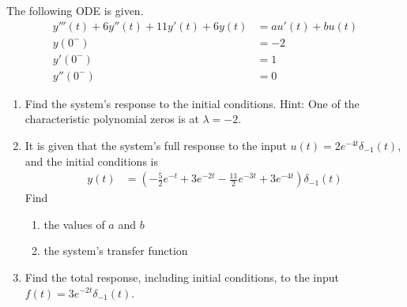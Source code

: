 \documentclass[fleqn, a4paper, 11pt, oneside]{amsart}
\theoremstyle{definition}
\theoremstyle{theorem}
\begin{document}
\begin{question}
	The following ODE is given.
	\begin{align*}
		y'''(t) + 6 y''(t) + 11 y'(t) + 6 y(t) & = a u'(t) + b u(t) \\
		y(0^-)                                 & = -2               \\
		y'(0^-)                                & = 1                \\
		y''(0^-)                               & = 0
	\end{align*}
	\begin{enumerate}
		\item
			Find the system's response to the initial conditions.
			Hint: One of the characteristic polynomial zeros is at $\lambda = -2$.
		\item
			It is given that the system's full response to the input $u(t) = 2 e^{-4 t} \delta_{-1}(t)$, and the initial conditions is
			\begin{align*}
				y(t) & = \left( -\frac{5}{2} e^{-t} + 3 e^{-2 t} - \frac{11}{2} e^{-3 t} + 3 e^{-4 t} \right) \delta_{-1}(t)
			\end{align*}
			Find
			\begin{enumerate}
				\item the values of $a$ and $b$
				\item the system's transfer function
			\end{enumerate}
		\item
			Find the total response, including initial conditions, to the input $f(t) = 3 e^{-2 t} \delta_{-1}(t)$.
	\end{enumerate}
\end{question}
\end{document}
